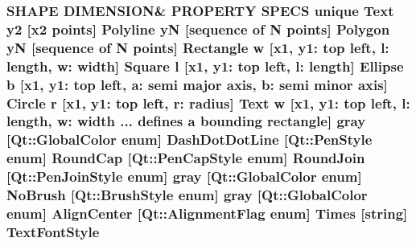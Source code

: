 \subsubsection[{\texorpdfstring{Text\+Font\+Style}{TextFontStyle}}]{\setlength{\rightskip}{0pt plus 5cm}S\+H\+A\+PE D\+I\+M\+E\+N\+S\+I\+ON\& P\+R\+O\+P\+E\+R\+TY S\+P\+E\+CS unique {\bf Text} {\bf y2} \mbox{[}{\bf x2} points\mbox{]} {\bf Polyline} yN \mbox{[}sequence of N points\mbox{]} {\bf Polygon} yN \mbox{[}sequence of N points\mbox{]} {\bf Rectangle} w \mbox{[}{\bf x1}, y1\+: top left, l\+: length, w\+: width\mbox{]} {\bf Square} {\bf l} \mbox{[}{\bf x1}, y1\+: top left, l\+: length\mbox{]} {\bf Ellipse} b \mbox{[}{\bf x1}, y1\+: top left, a\+: semi major axis, b\+: semi minor axis\mbox{]} {\bf Circle} r \mbox{[}{\bf x1}, y1\+: top left, r\+: radius\mbox{]} {\bf Text} w \mbox{[}{\bf x1}, y1\+: top left, l\+: length, w\+: width ... defines {\bf a} bounding rectangle\mbox{]} gray \mbox{[}Qt\+::\+Global\+Color enum\mbox{]} Dash\+Dot\+Dot\+Line \mbox{[}Qt\+::\+Pen\+Style enum\mbox{]} Round\+Cap \mbox{[}{\bf Qt\+::\+Pen\+Cap\+Style} enum\mbox{]} Round\+Join \mbox{[}{\bf Qt\+::\+Pen\+Join\+Style} enum\mbox{]} gray \mbox{[}Qt\+::\+Global\+Color enum\mbox{]} No\+Brush \mbox{[}{\bf Qt\+::\+Brush\+Style} enum\mbox{]} gray \mbox{[}Qt\+::\+Global\+Color enum\mbox{]} Align\+Center \mbox{[}Qt\+::\+Alignment\+Flag enum\mbox{]} Times \mbox{[}string\mbox{]} Text\+Font\+Style}\hypertarget{shape__input__file__specs_8txt_a60e4bb735145ede5f8b496b1e3ce6422}{}\label{shape__input__file__specs_8txt_a60e4bb735145ede5f8b496b1e3ce6422}
